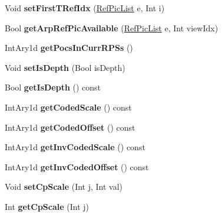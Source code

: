 \begin{DoxyCompactItemize}
Void {\bfseries set\+First\+T\+Ref\+Idx} (\hyperlink{_type_def_8h_a93cea48eb9dcfd661168dee82e41b384}{Ref\+Pic\+List} e, Int i)
\item 
\mbox{\label{class_t_com_slice_ac742c371ffb693cb518830ab76b9e9e2}} 
Bool {\bfseries get\+Arp\+Ref\+Pic\+Available} (\hyperlink{_type_def_8h_a93cea48eb9dcfd661168dee82e41b384}{Ref\+Pic\+List} e, Int view\+Idx)
\item 
\mbox{\label{class_t_com_slice_a3daf43e284627d4909767f90b0cc3704}} 
Int\+Ary1d {\bfseries get\+Pocs\+In\+Curr\+R\+P\+Ss} ()
\item 
\mbox{\label{class_t_com_slice_ac45071c50465b04254e1de2a48772e88}} 
Void {\bfseries set\+Is\+Depth} (Bool is\+Depth)
\item 
\mbox{\label{class_t_com_slice_ac78544cd608d56ac9cc28abd90af4325}} 
Bool {\bfseries get\+Is\+Depth} () const
\item 
\mbox{\label{class_t_com_slice_a514ce701b270313bf3ccf7bb2c3e9e64}} 
Int\+Ary1d {\bfseries get\+Coded\+Scale} () const
\item 
\mbox{\label{class_t_com_slice_a2bff7b25640f09b9e0868c5a47563761}} 
Int\+Ary1d {\bfseries get\+Coded\+Offset} () const
\item 
\mbox{\label{class_t_com_slice_a1ec3c6653a91cb9900c8520a43f3d24a}} 
Int\+Ary1d {\bfseries get\+Inv\+Coded\+Scale} () const
\item 
\mbox{\label{class_t_com_slice_ab2fecd36632cd1167ab1727f3622cb4e}} 
Int\+Ary1d {\bfseries get\+Inv\+Coded\+Offset} () const
\item 
\mbox{\label{class_t_com_slice_a503f26a9b81c40ee550abee9ce072ed9}} 
Void {\bfseries set\+Cp\+Scale} (Int j, Int val)
\item 
\mbox{\label{class_t_com_slice_ab9eeb6fc9b263542e5c2b3c356c3d256}} 
Int {\bfseries get\+Cp\+Scale} (Int j)
\item 
\mbox{\label{class_t_com_slice_adad2954d6f4d743dcc679f3ab1e01a4b}} 

\end{DoxyCompactItemize}
